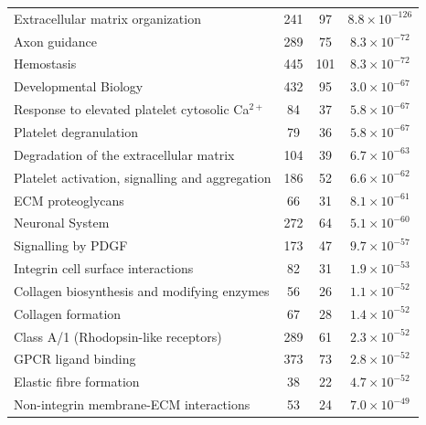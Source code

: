 \begin{table}[!hp]
{\begin{threeparttable}
\begin{tabular}{lccc}
  \hline 
  \rowcolor{Cluster_Red!20}
  Extracellular matrix organization & 241 &  97 & $8.8 \times 10^{-126}$ \\ 
  \rowcolor{Cluster_Red!15}
  Axon guidance & 289 &  75 & $8.3 \times 10^{-72}$ \\ 
  \rowcolor{Cluster_Red!20}
  Hemostasis & 445 & 101 & $8.3 \times 10^{-72}$ \\ 
  \rowcolor{Cluster_Red!15}
  Developmental Biology & 432 &  95 & $3.0 \times 10^{-67}$ \\ 
  \rowcolor{Cluster_Red!20}
  Response to elevated platelet cytosolic Ca$^{2+}$ &  84 &  37 & $5.8 \times 10^{-67}$ \\ 
  \rowcolor{Cluster_Red!15}
  Platelet degranulation &  79 &  36 & $5.8 \times 10^{-67}$ \\ 
  \rowcolor{Cluster_Red!20}
  Degradation of the extracellular matrix & 104 &  39 & $6.7 \times 10^{-63}$ \\ 
  \rowcolor{Cluster_Red!15}
  Platelet activation, signalling and aggregation & 186 &  52 & $6.6 \times 10^{-62}$ \\ 
  \rowcolor{Cluster_Red!20}
  ECM proteoglycans &  66 &  31 & $8.1 \times 10^{-61}$ \\ 
  \rowcolor{Cluster_Red!15}
  Neuronal System & 272 &  64 & $5.1 \times 10^{-60}$ \\ 
  \rowcolor{Cluster_Red!20}
  Signalling by PDGF & 173 &  47 & $9.7 \times 10^{-57}$ \\ 
  \rowcolor{Cluster_Red!15}
  Integrin cell surface interactions &  82 &  31 & $1.9 \times 10^{-53}$ \\ 
  \rowcolor{Cluster_Red!20}
  Collagen biosynthesis and modifying enzymes &  56 &  26 & $1.1 \times 10^{-52}$ \\ 
  \rowcolor{Cluster_Red!15}
  Collagen formation &  67 &  28 & $1.4 \times 10^{-52}$ \\ 
  \rowcolor{Cluster_Red!20}
  Class A/1 (Rhodopsin-like receptors) & 289 &  61 & $2.3 \times 10^{-52}$ \\ 
  \rowcolor{Cluster_Red!15}
  GPCR ligand binding & 373 &  73 & $2.8 \times 10^{-52}$ \\ 
  \rowcolor{Cluster_Red!20}
  Elastic fibre formation &  38 &  22 & $4.7 \times 10^{-52}$ \\ 
  \rowcolor{Cluster_Red!15}
  Non-integrin membrane-ECM interactions &  53 &  24 & $7.0 \times 10^{-49}$ \\ 

\end{tabular}
\end{threeparttable}}
\end{table}
